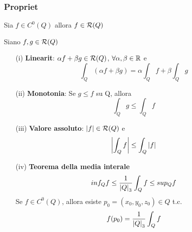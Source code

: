 \subsubsection{Propriet\aca}
\begin{theorem}
  Sia $f \in C^0\left(Q\right)$ allora $f \in \mathcal{R}(Q)$
\end{theorem}
\begin{theorem}
  Siano $f,g \in \mathcal{R} (Q)$
  \begin{itemize}
    \item[(i)] \textbf{Linearit\aca}: $\alpha f + \beta g \in \mathcal{R}(Q)$, $\forall \alpha,\beta\in\mathbb{R}$ e 
              $$\int_{Q}\left(\alpha f + \beta g\right) = \alpha \int_{Q}f + \beta \int_{Q} g$$
    \item[(ii)] \textbf{Monotonia}: Se $g\leq f$ su Q, allora $$\int_{Q} g \leq \int_{Q}f$$
    \item[(iii)] \textbf{Valore assoluto}: $\left\lvert f \right\rvert \in \mathcal{R}(Q)$ e $$\left\lvert \int_{Q}f \right\rvert \leq \int_{Q}\left\lvert f \right\rvert$$
    \item[(iv)] \textbf{Teorema della media interale} 
                $$inf_{Q} f \leq \frac{1}{\left\lvert Q \right\rvert_3}\int_{Q} f \leq sup_{Q}f$$
                Se $f \in C^0(Q)$, allora esiste $p_0 = (x_0,y_0,z_0)\in Q$ t.c. 
                $$f(p_0) = \frac{1}{\left\lvert Q \right\rvert_3}\int_{Q} f$$
  \end{itemize}
\end{theorem}
